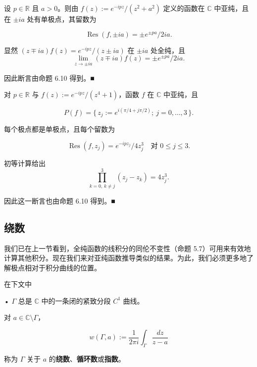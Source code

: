 \begin{example}
\begin{items}
设 $ p \in \mathbb{R} $ 且 $ a > 0 $。则由 $ f(z) := e^{-ipz}/(z^{2} + a^{2}) $ 定义的函数在 $ \mathbb{C} $ 中亚纯，且在 $ \pm ia $ 处有单极点，其留数为

\[
\operatorname{Res}(f,\pm ia) = \pm e^{\pm pa}/2ia .
\]

\proofhead
显然 $ (z \mp ia)f(z) = e^{-ipz}/(z \pm ia) $ 在 $ \pm ia $ 处全纯，且
\[
\lim_{z\to\pm ia}(z \mp ia)f(z) = \pm e^{\pm pa}/2ia .
\]

因此断言由命题 6.10 得到。\nobreak\hspace{0.35em}■

\item

对 $ p \in \mathbb{R} $ 与 $ f(z) := e^{-ipz}/(z^{4} + 1) $，函数 $ f $ 在 $ \mathbb{C} $ 中亚纯，且

\[
P(f) = \{\, z_{j} := e^{i(\pi/4+j\pi/2)} ;\ j = 0,\ldots,3 \,\} .
\]

每个极点都是单极点，且每个留数为

\[
\operatorname{Res}(f,z_{j}) = e^{-ipz_{j}}/4z_{j}^{3} \quad \text{对 } 0 \le j \le 3 .
\]

\proofhead
初等计算给出
\[
\prod_{k=0,\,k\ne j}^{3}(z_{j} - z_{k}) = 4z_{j}^{3} .
\]

因此这一断言也由命题 6.10 得到。\nobreak\hspace{0.35em}■

\end{items}

\end{example}

\subsection*{绕数}

我们已在上一节看到，全纯函数的线积分的同伦不变性（命题 5.7）可用来有效地计算其他积分。现在我们来对亚纯函数推导类似的结果。为此，我们必须更多地了解极点相对于积分曲线的位置。

在下文中

• $ \Gamma $ 总是 $ \mathbb{C} $ 中的一条闭的紧致分段 $ C^{1} $ 曲线。

对 $ a \in \mathbb{C}\setminus\Gamma $，

\[
w(\Gamma,a) := \frac{1}{2\pi i}\int_{\Gamma}\frac{dz}{z - a}
\]

称为 $ \Gamma $ 关于 $ a $ 的\textbf{绕数}、\textbf{循环数}或\textbf{指数}。

